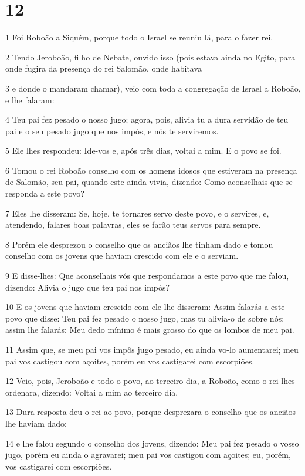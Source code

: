 \chapter{12}

\par 1 Foi Roboão a Siquém, porque todo o Israel se reuniu lá, para o fazer rei.
\par 2 Tendo Jeroboão, filho de Nebate, ouvido isso (pois estava ainda no Egito, para onde fugira da presença do rei Salomão, onde habitava
\par 3 e donde o mandaram chamar), veio com toda a congregação de Israel a Roboão, e lhe falaram:
\par 4 Teu pai fez pesado o nosso jugo; agora, pois, alivia tu a dura servidão de teu pai e o seu pesado jugo que nos impôs, e nós te serviremos.
\par 5 Ele lhes respondeu: Ide-vos e, após três dias, voltai a mim. E o povo se foi.
\par 6 Tomou o rei Roboão conselho com os homens idosos que estiveram na presença de Salomão, seu pai, quando este ainda vivia, dizendo: Como aconselhais que se responda a este povo?
\par 7 Eles lhe disseram: Se, hoje, te tornares servo deste povo, e o servires, e, atendendo, falares boas palavras, eles se farão teus servos para sempre.
\par 8 Porém ele desprezou o conselho que os anciãos lhe tinham dado e tomou conselho com os jovens que haviam crescido com ele e o serviam.
\par 9 E disse-lhes: Que aconselhais vós que respondamos a este povo que me falou, dizendo: Alivia o jugo que teu pai nos impôs?
\par 10 E os jovens que haviam crescido com ele lhe disseram: Assim falarás a este povo que disse: Teu pai fez pesado o nosso jugo, mas tu alivia-o de sobre nós; assim lhe falarás: Meu dedo mínimo é mais grosso do que os lombos de meu pai.
\par 11 Assim que, se meu pai vos impôs jugo pesado, eu ainda vo-lo aumentarei; meu pai vos castigou com açoites, porém eu vos castigarei com escorpiões.
\par 12 Veio, pois, Jeroboão e todo o povo, ao terceiro dia, a Roboão, como o rei lhes ordenara, dizendo: Voltai a mim ao terceiro dia.
\par 13 Dura resposta deu o rei ao povo, porque desprezara o conselho que os anciãos lhe haviam dado;
\par 14 e lhe falou segundo o conselho dos jovens, dizendo: Meu pai fez pesado o vosso jugo, porém eu ainda o agravarei; meu pai vos castigou com açoites; eu, porém, vos castigarei com escorpiões.
